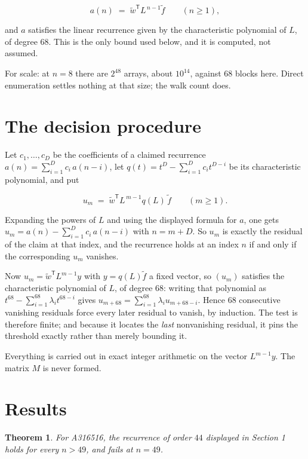 \documentclass[11pt]{article}
\newtheorem{theorem}{Theorem}
\theoremstyle{definition}
\begin{document}
\[a(n) \;=\; \tilde w^{\mathsf T} L^{\,n-1} \tilde f \qquad (n \ge 1),\]

and $a$ satisfies the linear recurrence given by the characteristic polynomial of $L$, of degree $68$. This is the only bound used below, and it is computed, not assumed.

For scale: at $n = 8$ there are $2^{48}$ arrays, about $10^{14}$, against $68$ blocks here. Direct enumeration settles nothing at that size; the walk count does.

\section{The decision procedure}

Let $c_1,\dots,c_D$ be the coefficients of a claimed recurrence $a(n) = \sum_{i=1}^{D} c_i\,a(n-i)$, let $q(t) = t^{D} - \sum_{i=1}^{D} c_i t^{D-i}$ be its characteristic polynomial, and put

\[u_m \;=\; \tilde w^{\mathsf T} L^{\,m-1} q(L)\,\tilde f \qquad (m \ge 1).\]

Expanding the powers of $L$ and using the displayed formula for $a$, one gets $u_m = a(n) - \sum_{i=1}^{D} c_i\,a(n-i)$ with $n = m + D$. So $u_m$ is exactly the residual of the claim at that index, and the recurrence holds at an index $n$ if and only if the corresponding $u_m$ vanishes.

Now $u_m = \tilde w^{\mathsf T} L^{m-1} y$ with $y = q(L)\tilde f$ a fixed vector, so $(u_m)$ satisfies the characteristic polynomial of $L$, of degree $68$: writing that polynomial as $t^{68} - \sum_{i=1}^{68} \lambda_i t^{68-i}$ gives $u_{m+68} = \sum_{i=1}^{68} \lambda_i u_{m+68-i}$. Hence $68$ consecutive vanishing residuals force every later residual to vanish, by induction. The test is therefore finite; and because it locates the {\itshape last} nonvanishing residual, it pins the threshold exactly rather than merely bounding it.

Everything is carried out in exact integer arithmetic on the vector $L^{m-1}y$. The matrix $M$ is never formed.

\section{Results}

\begin{theorem} For A316516, the recurrence of order $44$ displayed in Section 1 holds for every $n > 49$, and fails at $n = 49$.\end{theorem}
\end{document}
